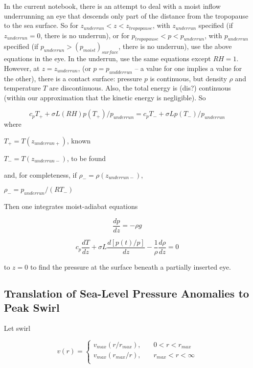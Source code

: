 \documentclass[preprint, prX]{revtex4}
\newcommand{\dd}[2]{\frac{d#1}{d#2}}
\begin{document}
In the current notebook, there is an attempt to deal with a moist inflow underrunning an eye that descends only part of the distance from the tropopause to the sea surface. So for $z_{underrun} < z < z_{tropopause}$, with $z_{underrun}$ specified (if $z_{underrun}=0$, there is no underrun), or for $p_{tropopause} < p < p_{underrun}$, with $p_{underrun}$ specified (if $p_{underrun} > (p_{moist})_{surface}$, there is no underrun), use the above equations in the eye. In the underrun, use the same equations except $RH=1$. However, at $z=z_{underrun}$, (or $p=p_{undderrun}$ -- a value for one implies a value for the other), there is a contact surface: pressure $p$ is continuous, but density $\rho$ and temperature $T$ are discontinuous. Also, the total energy is (dis?) continuous (within our approximation that the kinetic energy is negligible). So

\begin{equation}
	c_p T_+ + \sigma L (RH) p(T_+) / p_{underrun} = c_p T_- + \sigma L p(T_-) / p_{underrun}
\end{equation}
where

$T_+ = T(z_{underrun+})$, known

$T_- = T(z_{underrun-})$, to be found

and, for completeness, if $\rho_- = \rho(z_{underrun-})$,

$\rho_- = p_{underrun} / (RT_-)$

Then one integrates moist-adiabat equations

\begin{equation}
	\dd{p}{z} = -\rho g
\end{equation}

\begin{equation}
	c_p \dd{T}{z} + \sigma L \dd{[p(t)/p]}{z} - \frac{1}{\rho}\dd{\rho}{z} = 0
\end{equation}

to $z=0$ to find the pressure at the surface beneath a partially inserted eye.

\subsection{Translation of Sea-Level Pressure Anomalies to Peak Swirl}


Let swirl 

\begin{equation}
v(r) = 
\begin{cases} 
      v_{max}(r/r_{max}), \quad & 0 < r < r_{max} \\
      v_{max}(r_{max}/r),\quad & r_{max} < r < \infty \\
   \end{cases}
\end{equation}
\end{document}
